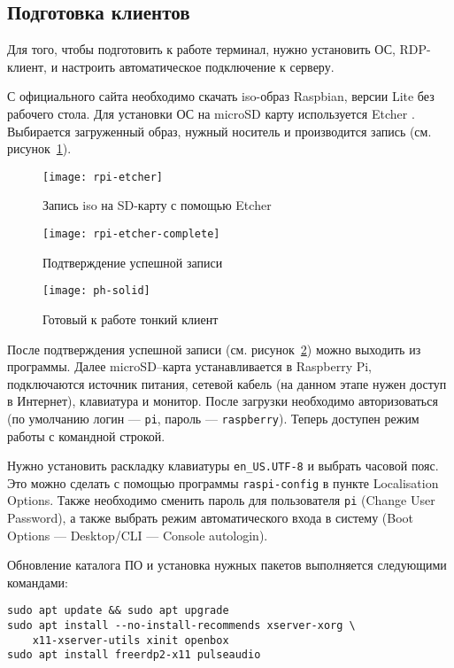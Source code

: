 \subsection{Подготовка клиентов}

Для того, чтобы подготовить к работе терминал, нужно установить ОС, RDP-клиент, и 
настроить автоматическое подключение к серверу.

С официального сайта \cite{ref:raspbian} необходимо скачать iso-образ Raspbian, версии
Lite без рабочего стола. Для установки ОС на microSD карту используется Etcher
\cite{ref:etcher}. Выбирается загруженный образ, нужный носитель и производится запись
(см. рисунок~\ref{pic:rpi-etcher}).

\begin{figure}[h]
    \center
    \texttt{[image: rpi-etcher]}
    \caption{Запись iso на SD-карту с помощью Etcher}
    \label{pic:rpi-etcher}
\end{figure}

\begin{figure}[h]
    \center
    \texttt{[image: rpi-etcher-complete]}
    \caption{Подтверждение успешной записи}
    \label{pic:rpi-etcher-complete}
\end{figure}

\begin{figure}[h]
    \center
    \texttt{[image: ph-solid]}
    \caption{Готовый к работе тонкий клиент}
    \label{pic:ph-solid}
\end{figure}

После подтверждения успешной записи (см. рисунок~\ref{pic:rpi-etcher-complete}) можно
выходить из программы. Далее microSD–карта устанавливается в Raspberry Pi, подключаются
источник питания, сетевой кабель (на данном этапе нужен доступ в Интернет), клавиатура 
и монитор. После загрузки необходимо авторизоваться (по умолчанию логин — 
\texttt{pi}, пароль — \texttt{raspberry}). Теперь доступен режим работы с командной
строкой.

Нужно установить раскладку клавиатуры \texttt{en\_US.UTF-8} и выбрать часовой пояс. Это можно
сделать с помощью программы \texttt{raspi-config} в пункте Localisation Options. Также
необходимо сменить пароль для пользователя \texttt{pi} (Change User Password), а также
выбрать режим автоматического входа в систему (Boot Options — Desktop/CLI — Console
autologin).

Обновление каталога ПО и установка нужных пакетов выполняется следующими командами:
\begin{verbatim}
sudo apt update && sudo apt upgrade
sudo apt install --no-install-recommends xserver-xorg \
    x11-xserver-utils xinit openbox
sudo apt install freerdp2-x11 pulseaudio
\end{verbatim}


